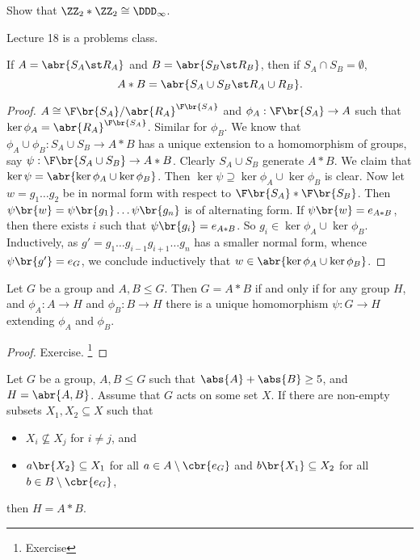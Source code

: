 \begin{exercise}
Show that $ \ZZ_2 * \ZZ_2 \cong \DDD_\infty $.
\end{exercise}


Lecture 18 is a problems class.

\pagebreak


\begin{proposition}
If $ A = \abr{S_A \st R_A} $ and $ B = \abr{S_B \st R_B} $, then if $ S_A \cap S_B = \emptyset $,
$$ A * B = \abr{S_A \cup S_B \st R_A \cup R_B}. $$
\end{proposition}

\begin{proof}
$ A \cong \F\br{S_A} / \abr{R_A}^{\F\br{S_A}} $ and $ \phi_A : \F\br{S_A} \to A $ such that $ \ker \phi_A = \abr{R_A}^{\F\br{S_A}} $. Similar for $ \phi_B $. We know that $ \phi_A \cup \phi_B : S_A \cup S_B \to A * B $ has a unique extension to a homomorphism of groups, say $ \psi : \F\br{S_A \cup S_B} \to A * B $. Clearly $ S_A \cup S_B $ generate $ A * B $. We claim that $ \ker \psi = \abr{\ker \phi_A \cup \ker \phi_B} $. Then $ \ker \psi \supseteq \ker \phi_A \cup \ker \phi_B $ is clear. Now let $ w = g_1 \dots g_2 $ be in normal form with respect to $ \F\br{S_A} * \F\br{S_B} $. Then $ \psi\br{w} = \psi\br{g_1} \dots \psi\br{g_n} $ is of alternating form. If $ \psi\br{w} = e_{A * B} $, then there exists $ i $ such that $ \psi\br{g_i} = e_{A * B} $. So $ g_i \in \ker \phi_A \cup \ker \phi_B $. Inductively, as $ g' = g_1 \dots g_{i - 1}g_{i + 1} \dots g_n $ has a smaller normal form, whence $ \psi\br{g'} = e_G $, we conclude inductively that $ w \in \abr{\ker \phi_A \cup \ker \phi_B} $.
\end{proof}

\begin{proposition}
Let $ G $ be a group and $ A, B \le G $. Then $ G = A * B $ if and only if for any group $ H $, and $ \phi_A : A \to H $ and $ \phi_B : B \to H $ there is a unique homomorphism $ \psi : G \to H $ extending $ \phi_A $ and $ \phi_B $.
\end{proposition}

\begin{proof}
Exercise. \footnote{Exercise}
\end{proof}

\begin{lemma}
Let $ G $ be a group, $ A, B \le G $ such that $ \abs{A} + \abs{B} \ge 5 $, and $ H = \abr{A, B} $. Assume that $ G $ acts on some set $ X $. If there are non-empty subsets $ X_1, X_2 \subseteq X $ such that
\begin{itemize}
\item $ X_i \not\subseteq X_j $ for $ i \ne j $, and
\item $ a\br{X_2} \subseteq X_1 $ for all $ a \in A \setminus \cbr{e_G} $ and $ b\br{X_1} \subseteq X_2 $ for all $ b \in B \setminus \cbr{e_G} $,
\end{itemize}
then $ H = A * B $.
\end{lemma}

